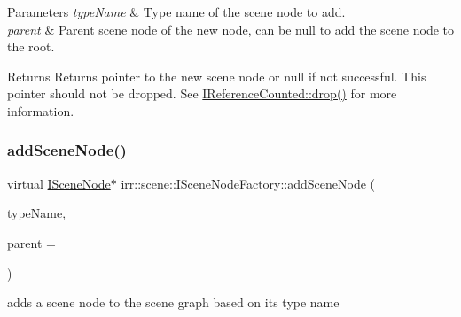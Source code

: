 \begin{DoxyParams}{Parameters}
{\em type\+Name} & Type name of the scene node to add. \\
\hline
{\em parent} & Parent scene node of the new node, can be null to add the scene node to the root. \\
\hline
\end{DoxyParams}
\begin{DoxyReturn}{Returns}
Returns pointer to the new scene node or null if not successful. This pointer should not be dropped. See \hyperlink{classirr_1_1IReferenceCounted_a03856a09355b89d178090c4a5f738543}{I\+Reference\+Counted\+::drop()} for more information. 
\end{DoxyReturn}
\mbox{\label{classirr_1_1scene_1_1ISceneNodeFactory_a7964a7a29260d7f0d4d052b85df78ffb}} 
\subsubsection{\texorpdfstring{add\+Scene\+Node()}{addSceneNode()}\hspace{0.1cm}{\footnotesize\ttfamily [4/4]}}
{\footnotesize\ttfamily virtual \hyperlink{classirr_1_1scene_1_1ISceneNode}{I\+Scene\+Node}$\ast$ irr\+::scene\+::\+I\+Scene\+Node\+Factory\+::add\+Scene\+Node (\begin{DoxyParamCaption}\item[{const \hyperlink{namespaceirr_a9395eaea339bcb546b319e9c96bf7410}{c8} $\ast$}]{type\+Name,  }\item[{\hyperlink{classirr_1_1scene_1_1ISceneNode}{I\+Scene\+Node} $\ast$}]{parent = {} }\end{DoxyParamCaption})\hspace{0.3cm}{\ttfamily [pure virtual]}}



adds a scene node to the scene graph based on its type name 


